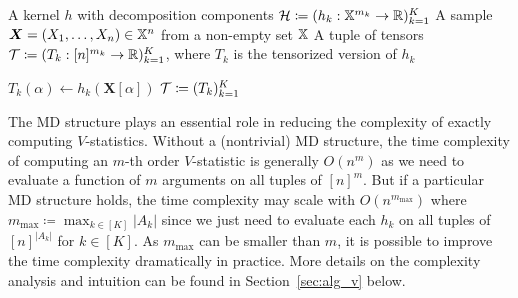 \documentclass[letterpaper,11pt]{article}
\newcommand{\Lin}[1]{{\color{purple}{Lin: #1}}}
\newcommand{\Zhang}[1]{{\color{blue}{Zhang: #1}}}
\newcommand{\samplespace}{\bbX}
\newcommand{\less}{O}
\begin{document}
\begin{bibunit}[plainnat]
\begin{algorithm}
    \caption{Tensorization of Kernel Function}
    \label{alg:tensorization}
    \begin{algorithmic}[1]
        \Require 
            \Statex A kernel $h$ with decomposition components ${\mathcal{H}} \coloneqq (h_k: {\mathbb{X}}^{m_k} \to {\mathbb{R}})_{k=1}^K$
            \Statex A sample $\bm{X} = (X_1, \dots, X_n) \in \samplespace^n$ from a non-empty set $\samplespace$
        \Ensure A tuple of tensors ${\mathcal{T}} \coloneqq (T_k: [n]^{m_k} \to {\mathbb{R}})_{k=1}^K$, where $T_k$ is the tensorized version of $h_k$

                    \State $T_k(\alpha) \gets h_k(\bm{X}[\alpha])$  
                \EndFor
            \EndFor
            \State \Return ${\mathcal{T}} \coloneqq (T_k)_{k=1}^K$  
        \EndFunction
    \end{algorithmic}
\end{algorithm}


The MD structure plays an essential role in reducing the complexity of exactly computing $V$-statistics. %
Without a (nontrivial) MD structure, the time complexity of computing an $m$-th order $V$-statistic is generally $\less (n^m)$ as we need to evaluate a function of $m$ arguments on all tuples of $[n]^m$. But if a particular MD structure holds, the time complexity may scale with $\less (n^{m_{\mathrm{max}}})$ where $m_{\mathrm{max}} \coloneqq \max_{k \in [K]} |A_k|$ since we just need to evaluate each  $h_k$ on all tuples of $[n]^{|A_k|}$ for $k \in [K]$. As $m_{\mathrm{max}}$ can be smaller than $m$, it is possible to improve the time complexity dramatically in practice. More details on the complexity analysis and intuition can be found in Section~\ref{sec:alg_v} below.


\end{bibunit}
\end{document}

